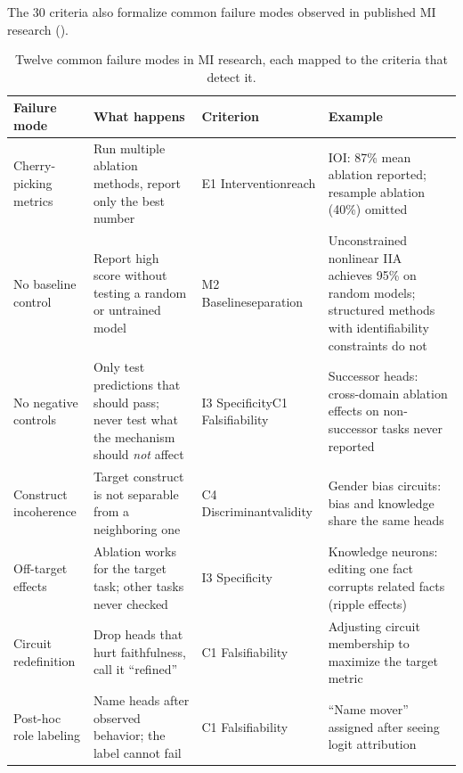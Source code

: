 \documentclass[10pt]{article}
\begin{document}
The 30 criteria also formalize common failure modes observed in published MI research ().

\begingroup
\small
\begin{table}[H]
\centering
\caption{Twelve common failure modes in MI research, each mapped to the criteria that detect it.}
\label{tab:failures}
\renewcommand{\arraystretch}{1.15}
\begin{tabular}{@{}l>{\raggedright\arraybackslash}p{3.2cm}>{\raggedright\arraybackslash}p{2.8cm}>{\raggedright\arraybackslash}p{4.0cm}@{}}
\toprule
\textbf{Failure mode} & \textbf{What happens} & \textbf{Criterion} & \textbf{Example} \\
\midrule
Cherry-picking metrics & Run multiple ablation methods, report only the best number & E1 Intervention\newline reach & IOI: 87\% mean ablation reported; resample ablation (40\%) omitted \\
\midrule
No baseline control & Report high score without testing a random or untrained model & M2 Baseline\newline separation & Unconstrained nonlinear IIA achieves 95\% on random models; structured methods with identifiability constraints do not \citep{sutter2025nonlinear} \\
\midrule
No negative controls & Only test predictions that should pass; never test what the mechanism should \emph{not} affect & I3 Specificity\newline C1 Falsifiability & Successor heads: cross-domain ablation effects on non-successor tasks never reported \\
\midrule
Construct incoherence & Target construct is not separable from a neighboring one & C4 Discriminant\newline validity & Gender bias circuits: bias and knowledge share the same heads \\
\midrule
Off-target effects & Ablation works for the target task; other tasks never checked & I3 Specificity & Knowledge neurons: editing one fact corrupts related facts (ripple effects) \\
\midrule
Circuit redefinition & Drop heads that hurt faithfulness, call it ``refined'' & C1 Falsifiability & Adjusting circuit membership to maximize the target metric \\
\midrule
Post-hoc role labeling & Name heads after observed behavior; the label cannot fail & C1 Falsifiability & ``Name mover'' assigned after seeing logit attribution \\

\end{tabular}
\end{table}
\end{document}
